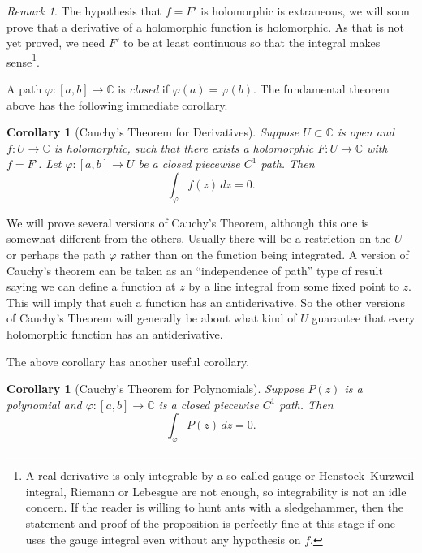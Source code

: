 \documentclass[12pt,openany]{book}
\newcommand{\C}{{\mathbb{C}}}
\theoremstyle{plain}
\newtheorem{cor}[thm]{Corollary}
\theoremstyle{remark}
\newtheorem{remark}[thm]{Remark}
\theoremstyle{definition}
\theoremstyle{exercise}
\theoremstyle{example}
\begin{document}
\begin{remark}
The hypothesis that $f=F'$ is holomorphic is extraneous,
we will soon prove that a derivative of a holomorphic function is
holomorphic.  As that is not yet proved, we need $F'$ to be at least
continuous so that the integral makes sense\footnote{%
A real derivative is only integrable
by a so-called gauge or Henstock--Kurzweil integral, Riemann or
Lebesgue are not enough, so integrability is not an idle concern.
If the reader is willing to hunt ants with a sledgehammer, then
the statement and proof of the proposition is perfectly fine at this stage
if one uses the gauge integral even without any hypothesis on $f$.}.
\end{remark}


A path $\varphi \colon [a,b] \to \C$ is \emph{closed} if 
$\varphi(a) = \varphi(b)$.  The fundamental theorem above has the following
immediate corollary.

\begin{cor}[Cauchy's Theorem for Derivatives] \label{cor:cauchyforders}
Suppose $U \subset \C$ is open and $f \colon U \to \C$
is holomorphic, such that there exists
a holomorphic $F \colon U \to \C$ with $f = F'$.
Let $\varphi \colon [a,b] \to U$ be a closed piecewise $C^1$ path.
Then
\begin{equation*}
\int_\varphi f(z) \, dz = 0 .
\end{equation*}
\end{cor}

We will prove several versions of Cauchy's Theorem, although this one is
somewhat different from the others.  Usually there will be a restriction on
the $U$ or perhaps the path $\varphi$ rather
than on the function being integrated.
A version of Cauchy's theorem can be taken as an ``independence of path''
type of result saying we can define a function at $z$ by a line integral
from some fixed point to $z$.  This will imply that such a function has an
antiderivative.  So the other versions of Cauchy's Theorem will generally
be about what kind of $U$ guarantee that every holomorphic function has an
antiderivative.

The above corollary has another useful corollary.

\begin{cor}[Cauchy's Theorem for Polynomials]
Suppose $P(z)$ is a polynomial and $\varphi \colon [a,b] \to \C$ is a closed
piecewise $C^1$ path.  Then
\begin{equation*}
\int_\varphi P(z) \, dz = 0 .
\end{equation*}
\end{cor}
\end{document}
